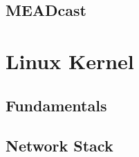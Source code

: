 


\subsection{MEADcast} %
\label{sub:MEADcast}


\section{Linux Kernel} %
\label{sec:Linux Kernel}

\subsection{Fundamentals} %
\label{sub:Fundamentals}


\subsection{Network Stack} %
\label{sub:Network Stack}


